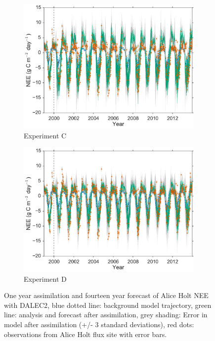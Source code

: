 \documentclass[review]{elsarticle}
\begin{document}
\begin{figure}
\begin{subfigure}[b]{0.49\textwidth}
        \includegraphics[width=\textwidth]{C4dvar2.pdf}
        \caption{Experiment C}
        \label{fig:4dvarBcorR}
    \end{subfigure}
    \begin{subfigure}[b]{0.49\textwidth}
        \includegraphics[width=\textwidth]{D4dvar2.pdf}
        \caption{Experiment D}
        \label{fig:4dvaredcBcorR}
    \end{subfigure}
    \caption{One year assimilation and fourteen year forecast of Alice Holt NEE with DALEC2, blue dotted line: background model trajectory, green line: analysis and forecast after assimilation, grey shading: Error in model after assimilation (+/- 3 standard deviations), red dots: observations from Alice Holt flux site with error bars.}\label{fig:4dvar}
\end{figure}
\end{document}
